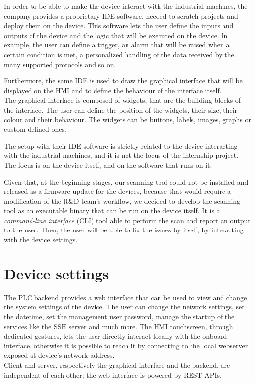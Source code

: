 In order to be able to make the device interact with the industrial machines, the company provides a proprietary IDE software, needed to scratch projects and deploy them on the device. This software lets the user define the inputs and outputs of the device and the logic that will be executed on the device. In example, the user can define a trigger, an alarm that will be raised when a certain condition is met, a personalized handling of the data received by the many supported protocols and so on.

Furthermore, the same IDE is used to draw the graphical interface that will be displayed on the HMI and to define the behaviour of the interface itself.\\
The graphical interface is composed of widgets, that are the building blocks of the interface. The user can define the position of the widgets, their size, their colour and their behaviour. The widgets can be buttons, labels, images, graphs or custom-defined ones.

The setup with their IDE software is strictly related to the device interacting with the industrial machines, and it is not the focus of the internship project. The focus is on the device itself, and on the software that runs on it.

Given that, at the beginning stages, our scanning tool could not be installed and released as a firmware update for the devices, because that would require a modification of the R\&D team's workflow, we decided to develop the scanning tool as an executable binary that can be run on the device itself. It is a \textit{command-line interface} (CLI) tool able to perform the scan and report an output to the user. Then, the user will be able to fix the issues by itself, by interacting with the device settings.

\section{Device settings}

The PLC backend provides a web interface that can be used to view and change the system settings of the device. The user can change the network settings, set the datetime, set the management user password, manage the startup of the services like the SSH server and much more. The HMI touchscreen, through dedicated gestures, lets the user directly interact locally with the onboard interface, otherwise it is possible to reach it by connecting to the local webserver exposed at device's network address. \\
Client and server, respectively the graphical interface and the backend, are independent of each other; the web interface is powered by REST APIs.

